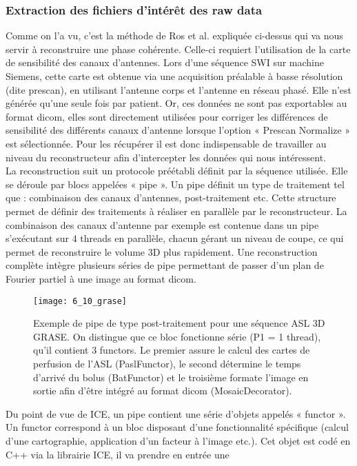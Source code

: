 {\subsubsection{Extraction des fichiers d’intérêt des raw data}
Comme on l’a vu, c’est la méthode de Ros et al. expliquée ci-dessus qui va nous servir à
reconstruire une phase cohérente. Celle-ci requiert l’utilisation de la carte de sensibilité des canaux
d’antennes. Lors d’une séquence SWI sur machine Siemens, cette carte est obtenue via une acquisition
préalable à basse résolution (dite prescan), en utilisant l’antenne corps et l’antenne en réseau phasé. Elle n’est générée qu’une seule fois par patient. Or, ces données ne sont pas exportables au format
dicom, elles sont directement utilisées pour corriger les différences de sensibilité des différents canaux
d’antenne lorsque l’option « Prescan Normalize » est sélectionnée. Pour les récupérer il est donc
indispensable de travailler au niveau du reconstructeur afin d’intercepter les données qui nous
intéressent.\\
La reconstruction suit un protocole préétabli définit par la séquence utilisée. Elle se déroule
par blocs appelées « pipe ». Un pipe définit un type de traitement tel que : combinaison des canaux
d’antennes, post-traitement etc. Cette structure permet de définir des traitements à réaliser en
parallèle par le reconstructeur. La combinaison des canaux d’antenne par exemple est contenue dans
un pipe s’exécutant sur 4 threads en parallèle, chacun gérant un niveau de coupe, ce qui permet de
reconstruire le volume 3D plus rapidement. Une reconstruction complète intègre plusieurs séries de
pipe permettant de passer d’un plan de Fourier partiel à une image au format dicom.\\
\begin{figure}[!t]
\centering
\texttt{[image: 6\_10\_grase]}
\caption{Exemple de pipe de type post-traitement pour une séquence ASL 3D GRASE. On distingue que ce bloc fonctionne
série (P1 = 1 thread), qu’il contient 3 functors. Le premier assure le calcul des cartes de perfusion de l’ASL (PaslFunctor), le
second détermine le temps d’arrivé du bolus (BatFunctor) et le troisième formate l’image en sortie afin d’être intégré au
format dicom (MosaicDecorator).}
\label{fig:6_10_grase}	
\end{figure}
Du point de vue de ICE, un pipe contient une série d’objets appelés « functor ». Un functor
correspond à un bloc disposant d’une fonctionnalité spécifique (calcul d’une cartographie, application
d’un facteur à l’image etc.). Cet objet est codé en C++ via la librairie ICE, il va prendre en entrée une
}
